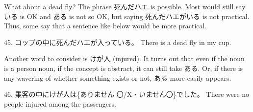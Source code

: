 \par{ What about a dead fly? The phrase 死んだハエ is possible. Most would still say いる is OK and ある is not so OK, but saying 死んだハエがいる is not practical. Thus, some say that a sentence like below would be more practical. }

\par{45. コップの中に死んだハエが入っている。 \hfill\break
There is a dead fly in my cup. }

\par{ Another word to consider is けが人 (injured). It turns out that even if the noun is a person noun, if the concept is abstract, it can still take ある. Or, if there is any wavering of whether something exists or not, ある more easily appears. }

\par{46. 乗客の中にけが人は\{ありません 〇\slash X・いません〇\}でした。 \hfill\break
There were no people injured among the passengers. }
    